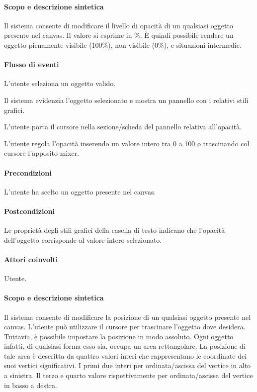 \paragraph{Scopo e descrizione sintetica}  Il sistema consente di modificare il livello di opacit\` a di un qualsiasi oggetto presente nel canvas. Il valore si esprime in \%.   \` E quindi possibile rendere un oggetto pienamente visibile (100\%), non visibile (0\%), e situazioni intermedie.
\paragraph{Flusso di eventi}
\begin{elenconumerato}[\textbf{}]{\subsubsecindent}
\item L'utente seleziona un oggetto valido.
\item Il sistema evidenzia l'oggetto selezionato e mostra un pannello con i relativi stili grafici.
\item L'utente porta  il cursore nella sezione/scheda del pannello relativa all'opacit\` a.
\item L'utente regola l'opacit\` a inserendo un valore intero tra 0 a 100 o trascinando col cursore l'apposito mixer.
\end{elenconumerato}
\paragraph{Precondizioni} L'utente ha scelto un oggetto presente nel canvas.
\paragraph{Postcondizioni} Le propriet\` a degli stili grafici della casella di testo indicano che l'opacit\` a dell'oggetto corrisponde al valore intero selezionato.

\paragraph{Attori coinvolti} Utente.
\paragraph{Scopo e descrizione sintetica} Il sistema consente di modificare la posizione di un qualsiasi oggetto presente nel canvas.  L'utente pu\` o utilizzare il cursore per trascinare l'oggetto dove desidera. 
Tuttavia, è possibile impostare la posizione in modo assoluto. Ogni oggetto infatti, di qualsiasi forma esso sia, occupa un area rettangolare. La posizione di tale area è descritta da quattro valori interi che rappresentano le coordinate dei suoi vertici significativi. I primi due interi per ordinata/ascissa del vertice in alto a sinistra. Il terzo e quarto valore rispettivamente per ordinata/ascissa del vertice in basso a destra.
